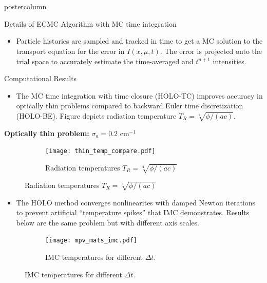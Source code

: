 \documentclass[xcolor=dvipsnames]{beamer}
\begin{document}
\begin{frame}
\begin{columns}
\begin{column}{.49\textwidth}
\begin{beamercolorbox}[center,wd=\textwidth]{postercolumn}
\begin{minipage}[T]{0.95\textwidth}
{\begin{block}{Details of ECMC Algorithm with MC time integration}
\begin{itemize}
\begin{equation*}
                {\tilde I}
            \end{equation*}\vspace{-0.10in}
        \item Particle histories are sampled and tracked in time to get a MC solution to
            the transport
            equation for the error in $\tilde I(x,\mu,t)$.  The error is projected onto
            the trial space to accurately estimate the time-averaged and $t^{n+1}$
            intensities.
    \end{itemize}
\end{block}
    \vfill
    \vfill
    \vfill
    \begin{block}{Computational Results}
    \begin{itemize}
        \setlength\itemsep{0.2em}
        \item The MC time integration with time closure (HOLO-TC) improves accuracy in optically thin problems compared
            to backward Euler time discretization (HOLO-BE). Figure depicts radiation temperature $T_R = \sqrt[4]{\phi/(ac)}$.
    \end{itemize}
    \vspace{0.7em}
    \centering \textbf{Optically thin problem:} $\sigma_a=0.2$ cm$^{-1}$
\begin{figure}
    \begin{subfigure}{\textwidth}
    \centering
    \texttt{[image: thin\_temp\_compare.pdf]}
    \caption{Radiation temperatures $T_R = \sqrt[4]{\phi/(ac)}$}
\end{subfigure}
\vspace{0.2in}
\end{figure}
    \begin{itemize}
        \item The HOLO method converges nonlinearites with damped Newton iterations to
            prevent artificial ``temperature spikes'' that IMC demonstrates.  Results below
            are the same problem but with different axis scales.
    \end{itemize}
    \vspace{0.3in}
\begin{figure}
\begin{subfigure}{0.49\textwidth}
    \centering
    \texttt{[image: mpv\_mats\_imc.pdf]}
    \caption{IMC temperatures for different $\Delta t$.\label{twomat_full}}
\end{subfigure} 

\end{figure}
\end{block}}
\end{minipage}
\end{beamercolorbox}
\end{column}
\end{columns}
\end{frame}
\end{document}
